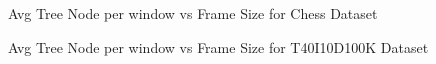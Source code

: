 			\begin{figure}[h]
			\centering
				
			\caption{Avg Tree Node per window vs Frame Size for Chess Dataset ~\cite{dataset}}
			\label{result:g_chess_memory_node}
			\end{figure}
			
			\begin{figure}[h]
				
			\caption{Avg Tree Node per window vs Frame Size for T40I10D100K Dataset ~\cite{dataset}}
			\label{result:g_t10_memory_node}
			\end{figure}
		